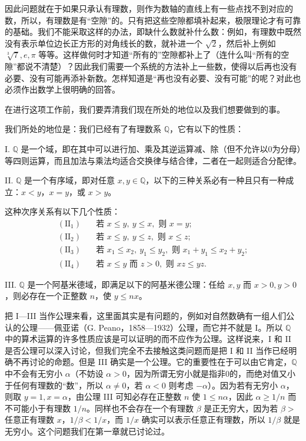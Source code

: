 因此问题就在于如果只承认有理数，则作为数轴的直线上有一些点找不到对应的数，所以，有理数是有“空隙”的。只有把这些空隙都填补起来，极限理论才有可靠的基础。我们不能采取这样的办法，即缺什么数就补什么数：例如，有理数中既然没有表示单位边长正方形的对角线长的数，就补进一个 $\sqrt2$，然后补上例如 $\sqrt[3]7,e,\pi$ 等等。这样做何时才知道“所有的”空隙都补上了（连什么叫“所有的空隙”都说不清楚）？因此我们需要一个系统的方法补上一些数，使得以后再也没有必要、没有可能再添补新数。怎样知道是“再也没有必要、没有可能”的呢？对此也必须作出数学上很明确的回答。

在进行这项工作前，我们要弄清我们现在所处的地位以及我们想要做到的事。

我们所处的地位是：我们已经有了有理数系 $\mathbb Q$，它有以下的性质：

\noindent I. $\mathbb Q$ 是一个域，即在其中可以进行加、乘及其逆运算减、除（但不允许以0为分母）等四则运算，而且加法与乘法均适合交换律与结合律，二者在一起则适合分配律。

\noindent II. $\mathbb Q$ 是一个有序域，即对任意 $x,y\in\mathbb Q$，以下的三种关系必有一种且只有一种成立：$x<y$，$x=y$，或 $x>y$。

这种次序关系有以下几个性质：
\begin{align*}
 (\mathrm{II}_1)&\quad \text{若 }x\le y,\ y\le x,\text{ 则 }x=y;\\
 (\mathrm{II}_2)&\quad \text{若 }x\le y,\ y\le z,\text{ 则 }x\le z;\\
 (\mathrm{II}_3)&\quad \text{若 }x_1\le x_2,\ y_1\le y_2,\text{ 则 }x_1+y_1\le x_2+y_2;\\
 (\mathrm{II}_4)&\quad \text{若 }x\le y\text{ 而 }z>0,\text{ 则 }xz\le yz.
\end{align*}

\noindent III. $\mathbb Q$ 是一个阿基米德域，即满足以下的阿基米德公理：任给 $x,y$ 而 $x>0,y>0$，则必存在一个正整数 $n$，使 $y\le nx$。

把 I—III 当作公理来看，这里面其实是有问题的，例如对自然数确有一组人们公认的公理——佩亚诺（G. Peano，1858—1932）公理，而它并不就是 I。所以 $\mathbb Q$ 中的算术运算的许多性质应该是可以证明的而不应作为公理。这样说来，I 和 II 是否公理可以深入讨论，但我们完全不去接触这类问题而是把 I 和 II 当作已经明确不再讨论的命题。但是 III 确实是一个公理。它的重要性在于可以由它肯定，$\mathbb Q$ 中不会有无穷小 $\alpha$（不妨设 $\alpha>0$，因为所谓无穷小就是指非0的，而绝对值又小于任何有理数的“数”，所以 $\alpha\ne0$，若 $\alpha<0$ 则考虑 $-\alpha$）。因为若有无穷小 $\alpha$，则取 $y=1,x=\alpha$，由公理 III 可知必存在正整数 $n$ 使 $1\le n\alpha$，因此 $\alpha\ge1/n$ 而不可能小于有理数 $1/n$。同样也不会存在一个有理数 $\beta$ 是正无穷大，因为若 $\beta>$ 任意正有理数 $x$，$1/\beta<1/x$，而 $1/x$ 确实可以表示任意正有理数，所以 $1/\beta$ 就是无穷小。这个问题我们在第一章就已讨论过。

